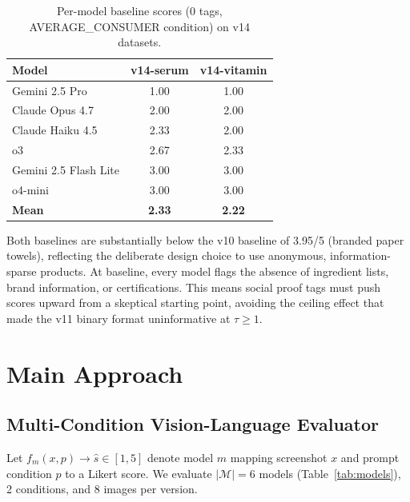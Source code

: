 \documentclass[11pt]{article}
\begin{document}
\begin{table}[H]
\centering\small\vspace{-4pt}
\caption{Per-model baseline scores (0 tags, AVERAGE\_CONSUMER condition) on v14 datasets.}\label{tab:baseline}
\begin{tabular}{@{}lcc@{}}
\toprule
\textbf{Model} & \textbf{v14-serum} & \textbf{v14-vitamin} \\
\midrule
Gemini 2.5 Pro        & 1.00 & 1.00 \\
Claude Opus 4.7       & 2.00 & 2.00 \\
Claude Haiku 4.5      & 2.33 & 2.00 \\
o3                    & 2.67 & 2.33 \\
Gemini 2.5 Flash Lite & 3.00 & 3.00 \\
o4-mini               & 3.00 & 3.00 \\
\midrule
\textbf{Mean}         & \textbf{2.33} & \textbf{2.22} \\
\bottomrule
\end{tabular}
\vspace{-4pt}
\end{table}

Both baselines are substantially below the v10 baseline of 3.95/5 (branded paper towels), reflecting the deliberate design choice to use anonymous, information-sparse products. At baseline, every model flags the absence of ingredient lists, brand information, or certifications. This means social proof tags must push scores upward from a skeptical starting point, avoiding the ceiling effect that made the v11 binary format uninformative at $\tau \geq 1$.

\section{Main Approach}

\subsection{Multi-Condition Vision-Language Evaluator}

Let $f_m(x, p) \to \hat{s} \in [1,5]$ denote model $m$ mapping screenshot $x$ and prompt condition $p$ to a Likert score. We evaluate $|\mathcal{M}|=6$ models (Table~\ref{tab:models}), 2 conditions, and 8 images per version.
\end{document}
